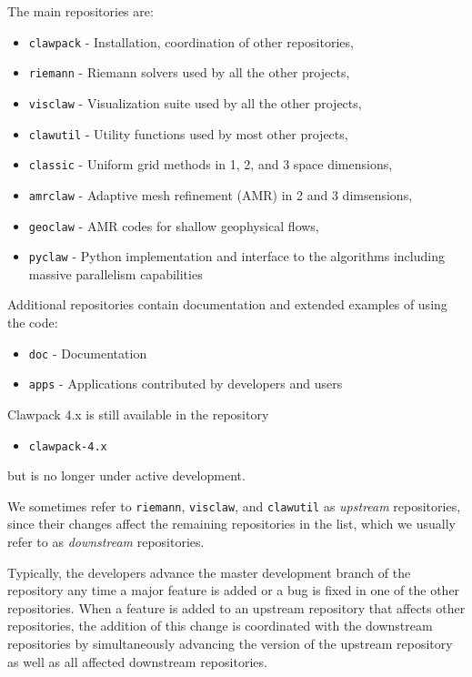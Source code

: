 The main \clawpack repositories are:
\begin{itemize}
    \item \texttt{clawpack} - Installation, coordination of other repositories,
    \item \texttt{riemann} - Riemann solvers used by all the other projects,
    \item \texttt{visclaw} - Visualization suite used by all the other projects,
    \item \texttt{clawutil} - Utility functions used by most other projects,
    \item \texttt{classic} - Uniform grid methods in 1, 2, and 3 space dimensions,
    \item \texttt{amrclaw} - Adaptive mesh refinement (AMR) in 2 and 3 dimsensions,
    \item \texttt{geoclaw} - AMR codes for shallow geophysical flows,
    \item \texttt{pyclaw} - Python implementation and interface to the \clawpack algorithms including massive parallelism capabilities
\end{itemize}

Additional repositories contain documentation and extended examples of
using the code: 
\begin{itemize}
    \item \texttt{doc} - Documentation
    \item \texttt{apps} - Applications contributed by developers and users
\end{itemize}
Clawpack 4.x is still available in the repository
\begin{itemize}
    \item \texttt{clawpack-4.x}
\end{itemize}
but is no longer under active development.

We sometimes refer to \texttt{riemann}, \texttt{visclaw}, and
\texttt{clawutil} as
\textit{upstream} repositories, since their changes affect the
remaining repositories in the list, which we usually refer to as
\textit{downstream} repositories.

Typically, the \clawpack developers advance the master development
branch of the repository any time a major feature is added or a bug is
fixed in one of the other repositories.  When a feature is added to an
upstream repository that affects other repositories, the addition of
this change is coordinated with the downstream repositories by
simultaneously advancing the version of the upstream repository as
well as all affected downstream repositories.  

